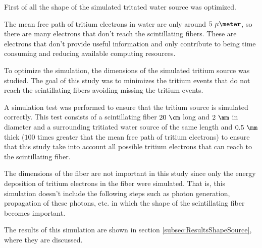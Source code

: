 First of all the shape of the simulated tritated water source was optimized. 

The mean free path of tritium electrons in water are only around $5~\mu\meter$, so there are many electrons that don't reach the scintillating fibers. These are electrons that don't provide useful information and only contribute to being time consuming and reducing available computing resources.

To optimize the simulation, the dimensions of the simulated tritium source was studied. The goal of this study was to minimizes the tritium events that do not reach the scintillating fibers avoiding missing the tritium events.

A simulation test was performed to ensure that the tritium source is simulated correctly. This test consists of a scintillating fiber $20~\cm$ long and $2~\mm$ in diameter and a surrounding tritiated water source of the same length and $0.5~\mm$ thick ($100$ times greater that the mean free path of tritium electrons) to ensure that this study take into account all possible tritium electrons that can reach to the scintillating fiber. 

The dimensions of the fiber are not important in this study since only the energy deposition of tritium electrons in the fiber were simulated. That is, this simulation doesn't include the following steps such as photon generation, propagation of these photons, etc. in which the shape of the scintillating fiber becomes important.


The results of this simulation are shown in section \ref{subsec:ResultsShapeSource}, where they are discussed.